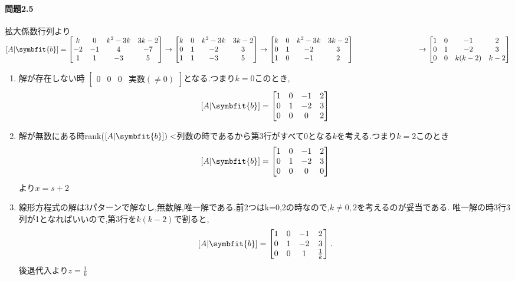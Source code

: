 \paragraph{問題2.5}
拡大係数行列より\\
$[A|\symbfit{b}]=
\begin{bmatrix}
    k & 0 & k^2-3k & 3k-2 \\
    -2 & -1 & 4 & -7 \\
    1 & 1& -3 & 5
\end{bmatrix}\rightarrow
\begin{bmatrix}
    k & 0 & k^2-3k & 3k-2 \\
    0 & 1 & -2 & 3 \\
    1 & 1 & -3 & 5
\end{bmatrix}\rightarrow
\begin{bmatrix}
    k & 0 & k^2-3k & 3k-2 \\
    0 & 1 & -2 & 3 \\
    1 & 0 & -1 & 2
\end{bmatrix}\\ \hspace{3cm}\rightarrow
\begin{bmatrix}
    1 & 0 & -1 & 2 \\
    0 & 1 & -2 & 3 \\
    0 & 0 & k(k-2) & k-2
\end{bmatrix}$
\begin{enumerate}[label=(\arabic*)]
    \item 解が存在しない時
$\begin{bmatrix}
    0 & 0 & 0 & \text{実数}(\neq 0)
\end{bmatrix}$となる.つまり$k=0$このとき,
\[
[A|\symbfit{b}] =
\begin{bmatrix}
    1 & 0 & -1 & 2 \\
    0 & 1 & -2 & 3 \\
    0 & 0 & 0 & 2
\end{bmatrix}\]
\item 解が無数にある時rank($[A|\symbfit{b}]) < $列数の時であるから第3行がすべて0となる$k$を考える.つまり$k=2$このとき
\[
[A|\symbfit{b}] =
\begin{bmatrix}
    1 & 0 & -1 & 2 \\
    0 & 1 & -2 & 3 \\
    0 & 0 & 0 & 0
\end{bmatrix}
\]
より$x=s+2$
\item 線形方程式の解は3パターンで解なし,無数解,唯一解である.前2つはk=0,2の時なので,$k \neq 0,2$を考えるのが妥当である.
唯一解の時3行3列が1となればいいので,第3行を$k(k-2)$で割ると,
\[
[A|\symbfit{b}] =
\begin{bmatrix}
    1 & 0 & -1 & 2 \\
    0 & 1 & -2 & 3 \\
    0 & 0 & 1 & \frac{1}{k}
\end{bmatrix}.
\]
後退代入より$\displaystyle z=\frac{1}{k}$
\end{enumerate}

